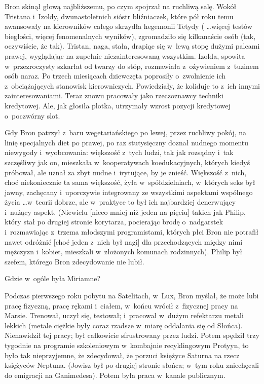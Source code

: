 \documentclass[oneside,polish,11pt,rmheadings]{mwbk}
\begin{document}
Bron skinął głową najbliższemu, po czym spojrzał na ruchliwą salę. Wokół Tristana i~Izoldy, dwunastoletnich sióstr bliźniaczek, które pół roku temu awansowały na kierowników całego skrzydła hegemonii Tetydy ( \ldots  więcej testów biegłości, więcej fenomenalnych wyników), zgromadziło się kilkanaście osób (tak, oczywiście, że tak). Tristan, naga, stała, drapiąc się w~lewą stopę dużymi palcami prawej, wyglądając na zupełnie niezainteresowaną wszystkim. Izolda, spowita w~przezroczysty szkarłat od twarzy do stóp, rozmawiała z~ożywieniem z~tuzinem osób naraz. Po trzech miesiącach dziewczęta poprosiły o~zwolnienie ich z~obciążających stanowisk kierowniczych. Powiedziały, że koliduje to z~ich innymi zainteresowaniami. Teraz znowu pracowały jako rzeczoznawcy techniki kredytowej. Ale, jak głosiła plotka, utrzymały wzrost pozycji kredytowej o~poczwórny slot. 

Gdy Bron patrzył z~baru wegetariańskiego po lewej, przez ruchliwy pokój, na linię specjalnych diet po prawej, po raz stutysięczny doznał nudnego momentu niewygody i~wyobcowania: większość z~tych ludzi, tak jak rozsądny i~tak szczęśliwy jak on, mieszkała w~kooperatywach koedukacyjnych, których kiedyś próbował, ale uznał za zbyt nudne i~irytujące, by je znieść. Większość z~nich, choć niekoniecznie ta sama większość, żyła w~spółdzielniach, w~których seks był jawny, zachęcany i~uporczywie integrowany ze wszystkimi aspektami wspólnego życia \ldots  w~teorii dobrze, ale w~praktyce to był ich najbardziej denerwujący i~nużący aspekt. (Niewielu [nieco mniej niż jeden na pięciu] takich jak Philip, który stał po drugiej stronie korytarza, pocierając brodę o~nadgarstek i~rozmawiając z~trzema młodszymi programistami, których płci Bron nie potrafił nawet odróżnić [choć jeden z~nich był nagi] dla przechodzących między nimi mężczyzn i~kobiet,  mieszkali w~złożonych komunach rodzinnych). Philip był szefem, którego Bron zdecydowanie nie lubił. 

Gdzie w~ogóle była Miriamne? 

Podczas pierwszego roku pobytu na Satelitach, w~Lux, Bron myślał, że może lubi pracę fizyczną, pracę rękami i~ciałem, w~końcu wrócił z~fizycznej pracy na Marsie. Trenował, uczył się, testował; i~pracował w~dużym refektarzu metali lekkich (metale ciężkie były coraz rzadsze w~miarę oddalania się od Słońca). Nienawidził tej pracy; był całkowicie sfrustrowany przez ludzi. Potem spędził trzy tygodnie na programie szkoleniowym w~kombajnie recyklingowym Protyyn, to było tak nieprzyjemne, że zdecydował, że porzuci księżyce Saturna na rzecz księżyców Neptuna. (Jowisz był po drugiej stronie słońca; w~tym roku zniechęcali do emigracji na Ganimedesa). Potem była praca w~kanale publicznym. 
\end{document}
